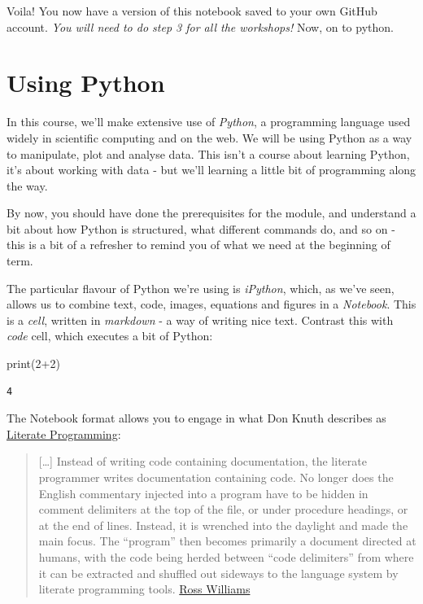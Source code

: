 \documentclass[
  letterpaper,
  DIV=11,
  numbers=noendperiod]{scrreprt}
\newenvironment{Shaded}{\begin{snugshade}}{\end{snugshade}}
\newcommand{\BuiltInTok}[1]{\textcolor[rgb]{0.00,0.23,0.31}{#1}}
\newcommand{\DecValTok}[1]{\textcolor[rgb]{0.68,0.00,0.00}{#1}}
\newcommand{\NormalTok}[1]{\textcolor[rgb]{0.00,0.23,0.31}{#1}}
\newcommand{\OperatorTok}[1]{\textcolor[rgb]{0.37,0.37,0.37}{#1}}
\begin{document}
Voila! You now have a version of this notebook saved to your own GitHub
account. \emph{You will need to do step 3 for all the workshops!} Now,
on to python.

\hypertarget{using-python}{%
\section{Using Python}\label{using-python}}

In this course, we'll make extensive use of \emph{Python}, a programming
language used widely in scientific computing and on the web. We will be
using Python as a way to manipulate, plot and analyse data. This isn't a
course about learning Python, it's about working with data - but we'll
learning a little bit of programming along the way.

By now, you should have done the prerequisites for the module, and
understand a bit about how Python is structured, what different commands
do, and so on - this is a bit of a refresher to remind you of what we
need at the beginning of term.

The particular flavour of Python we're using is \emph{iPython}, which,
as we've seen, allows us to combine text, code, images, equations and
figures in a \emph{Notebook}. This is a \emph{cell}, written in
\emph{markdown} - a way of writing nice text. Contrast this with
\emph{code} cell, which executes a bit of Python:

\begin{Shaded}
\begin{Highlighting}[]
\BuiltInTok{print}\NormalTok{(}\DecValTok{2}\OperatorTok{+}\DecValTok{2}\NormalTok{)}
\end{Highlighting}
\end{Shaded}

\begin{verbatim}
4
\end{verbatim}

The Notebook format allows you to engage in what Don Knuth describes as
\href{http://en.wikipedia.org/wiki/Literate_programming}{Literate
Programming}:

\begin{quote}
{[}\ldots{]} Instead of writing code containing documentation, the
literate programmer writes documentation containing code. No longer does
the English commentary injected into a program have to be hidden in
comment delimiters at the top of the file, or under procedure headings,
or at the end of lines. Instead, it is wrenched into the daylight and
made the main focus. The ``program'' then becomes primarily a document
directed at humans, with the code being herded between ``code
delimiters'' from where it can be extracted and shuffled out sideways to
the language system by literate programming tools.
\href{http://www.literateprogramming.com/lpquotes.html}{Ross Williams}
\end{quote}
\end{document}
